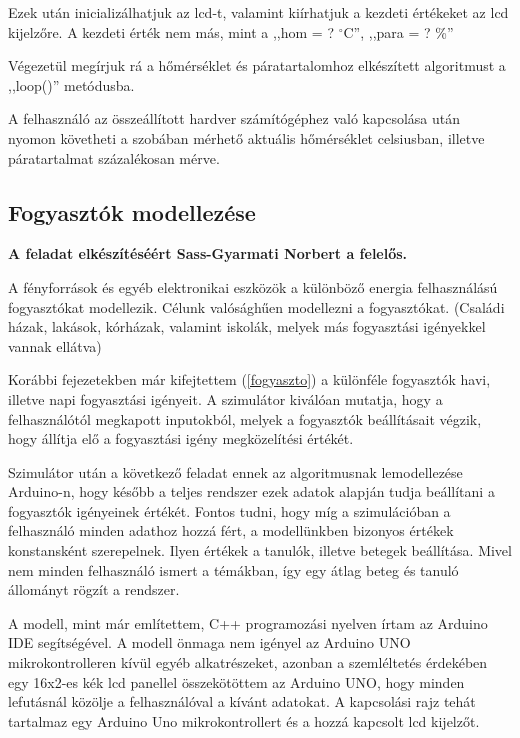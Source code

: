 \documentclass[
]{thesis-ekf}
\theoremstyle{definition}
\theoremstyle{remark}
\begin{document}
			
			\par Ezek után inicializálhatjuk az lcd-t, valamint kiírhatjuk a kezdeti értékeket az lcd kijelzőre. A kezdeti érték nem más, mint a ,,hom = ? $^{\circ}$C'', ,,para = ? \%''				
			
			\par Végezetül megírjuk rá a hőmérséklet és páratartalomhoz elkészített algoritmust a ,,loop()'' metódusba.
						
			\par A felhasználó az összeállított hardver számítógéphez való kapcsolása után nyomon követheti a szobában mérhető aktuális hőmérséklet celsiusban, illetve páratartalmat százalékosan mérve.
		\subsection{Fogyasztók modellezése}
			\textbf{A feladat elkészítéséért Sass-Gyarmati Norbert a felelős.} 
			\par A fényforrások és egyéb elektronikai eszközök a különböző energia felhasználású fogyasztókat modellezik. Célunk valósághűen modellezni a fogyasztókat. (Családi házak, lakások, kórházak, valamint iskolák, melyek más fogyasztási igényekkel vannak ellátva) 
			\par Korábbi fejezetekben már kifejtettem  (\ref{fogyaszto}) a különféle fogyasztók havi, illetve napi fogyasztási igényeit. A szimulátor kiválóan mutatja, hogy a felhasználótól megkapott inputokból, melyek a fogyasztók beállításait végzik, hogy állítja elő a fogyasztási igény megközelítési értékét. 
			\par Szimulátor után a következő feladat ennek az algoritmusnak lemodellezése Arduino-n, hogy később a teljes rendszer ezek adatok alapján tudja beállítani a fogyasztók igényeinek értékét. Fontos tudni, hogy míg a szimulációban a felhasználó minden adathoz hozzá fért, a modellünkben bizonyos értékek konstansként szerepelnek. Ilyen értékek a tanulók, illetve betegek beállítása. Mivel nem minden felhasználó ismert a témákban, így egy átlag beteg és tanuló állományt rögzít a rendszer. 
			\par A modell, mint már említettem, C++ programozási nyelven írtam az Arduino IDE segítségével. A  modell önmaga nem igényel az  Arduino UNO mikrokontrolleren kívül egyéb alkatrészeket, azonban a szemléltetés érdekében egy 16x2-es kék lcd panellel összekötöttem az Arduino UNO, hogy minden lefutásnál közölje a felhasználóval a kívánt adatokat. A kapcsolási rajz tehát tartalmaz egy Arduino Uno mikrokontrollert és a hozzá kapcsolt lcd kijelzőt.
\end{document}
